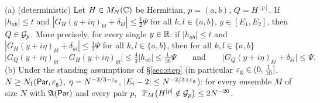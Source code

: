 \begin{lemma}\label{lem:RfromS}
\textup{(a) (deterministic)} Let $H\in M_N(\mathbb{C})$ be Hermitian, $p=(a,b)$, $Q=H^{[p]}$. If $|h_{ab}|\le t$ and
$|G_H(y+i\eta)_{kl}+\delta_{kl}|\le\frac12\Psi$ for all $k,l\in\{a,b\}$, $y\in[E_1,E_2]$, then $Q\in\mathcal{G}_p$.
More precisely, for every single $y\in\mathbb{R}$: if $|h_{ab}|\le t$ and $|G_H(y+i\eta)_{kl}+\delta_{kl}|\le\frac12\Psi$ for all $k,l\in\{a,b\}$, then for all $k,l\in\{a,b\}$
\begin{equation}\label{eq:b1:RS}
\big|G_Q(y+i\eta)_{kl}-G_H(y+i\eta)_{kl}\big|\le\tfrac43|h_{ab}|\le\tfrac1{30}\Psi\qquad\text{and}\qquad\big|G_Q(y+i\eta)_{kl}+\delta_{kl}\big|\le\Psi .
\end{equation}
\textup{(b)} Under the standing assumptions of \S\ref{sec:step} \textup{(}in particular $\varepsilon_{\mathrm g}\in(0,\frac1{10}]$, $N\ge N_1(\mathsf{Par},\varepsilon_{\mathrm g})$, $\eta=N^{-2/3-\varepsilon_{\mathrm g}}$, $|E_i-2|\le N^{-2/3+\varepsilon_{\mathrm g}}$\textup{)}:
for every ensemble $M$ of size $N$ with $\mathfrak{A}(\mathsf{Par})$ and every pair $p$, $\ \P_M\big(H^{[p]}\notin\cG_p\big)\le2N^{-20}$.
\end{lemma}
